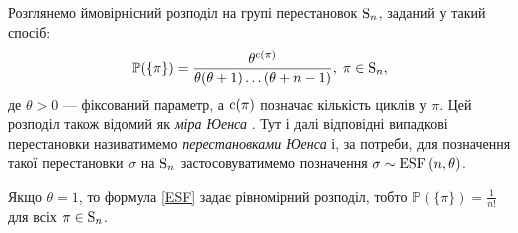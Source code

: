 Розглянемо ймовірнісний розподіл на групі перестановок $\mathrm{S}_{n}$, 
заданий у такий спосіб:
\begin{equation}\label{ESF}
    \mathbb{P}(\{\pi\}) = \frac{
        \theta^{\operatorname{c}(\pi)}
    }{
        \theta (\theta + 1) \dots (\theta + n - 1)
    }, \; \pi \in \mathrm{S}_{n},
\end{equation}
де $\theta > 0$ --- фіксований параметр, а $\operatorname{c}(\pi)$ позначає кількість циклів у $\pi$.
Цей розподіл також відомий як
\emph{міра Юенса} \cite{Manstavicius}. Тут і далі
відповідні випадкові перестановки називатимемо
\emph{перестановками Юенса} і, за потреби, для позначення
такої перестановки $\sigma$ на $\mathrm{S}_{n}$ застосовуватимемо
позначення $\sigma \sim \mathrm{ESF}\left(n, \theta\right)$.

\begin{remark}
    Якщо $\theta = 1$, то формула \eqref{ESF} задає рівномірний розподіл,
    тобто $\mathbb{P}(\{\pi\}) = \frac{1}{n!}$ для всіх $\pi \in \mathrm{S}_{n}$.
\end{remark}

